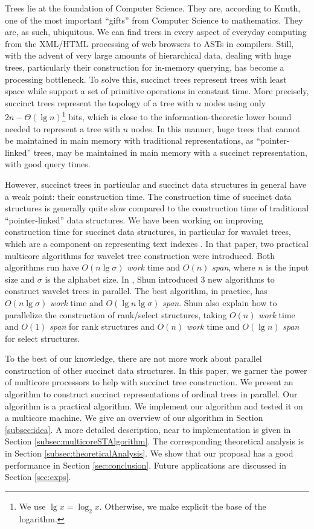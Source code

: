 Trees lie at the foundation of Computer Science. They are, according
to Knuth, one of the most important ``gifts'' from Computer Science to
mathematics. They are, as such, ubiquitous. We can find trees in every
aspect of everyday computing from the XML/HTML processing of web
browsers to ASTs in compilers. Still, with the advent of very large
amounts of hierarchical data, dealing with huge trees, particularly
their construction for in-memory querying, has become a processing
bottleneck. To solve this, succinct trees represent trees with least
space while support a set of primitive operations in constant time.
More precisely, succinct trees represent the topology of a tree with 
$n$ nodes using only $2n-\Theta(\lg n)$\footnote{We use $\lg x = \log_{2}x$. Otherwise, we make explicit the base of the logarithm.} bits, which is close to the
information-theoretic lower bound needed to represent a tree with $n$
nodes. In this manner, huge trees that cannot be maintained in main
memory with traditional representations, as ``pointer-linked'' trees,
may be maintained in main memory with a succinct representation, with good
query times.

However, succinct trees in particular and succinct data structures in general
have a weak point: their construction time. The construction time of succinct
data structures is generally quite slow compared to the construction time of
traditional ``pointer-linked'' data structures. We have been working
on improving construction time for succinct data structures, in particular
for wavalet trees, which are a component on representing text indexes
\cite{Fuentes2014}. In that paper, two practical multicore algorithms
for wavelet tree construction were introduced. Both algorithms run
have $O(n\lg \sigma)$ {\em work} time and $O(n)$ {\em span}, where $n$
is the input size and $\sigma$ is the alphabet size. In
\cite{DBLP:journals/corr/Shun14}, Shun introduced 3 new algorithms to
construct wavelet trees in parallel. The best algorithm, in practice,
has $O(n\lg \sigma)$ {\em work} time and $O(\lg n\lg \sigma)$ {\em
span}. Shun also explain how to parallelize the construction of
rank/select structures, taking $O(n)$ {\em work} time and $O(1)$ {\em
span} for rank structures and $O(n)$ {\em work} time and $O(\lg n)$
{\em span} for select structures.

To the best of our knowledge, there are not more work about parallel
construction of other succinct data structures. In this paper, we garner
the power of multicore processors to help with succinct tree construction.
We present an algorithm to construct succinct representations of ordinal
trees in parallel. Our algorithm is a practical algorithm. We implement
our algorithm and tested it on a multicore machine. We give an overview
of our algorithm in Section \ref{subsec:idea}. A more detailed description,
near to implementation is given in Section \ref{subsec:multicoreSTAlgorithm}.
The corresponding theoretical analysis is in Section \ref{subsec:theoreticalAnalysis}.
We show that our proposal has a good performance in Section \ref{sec:conclusion}. Future
applications are discussed in Section \ref{sec:exps}.